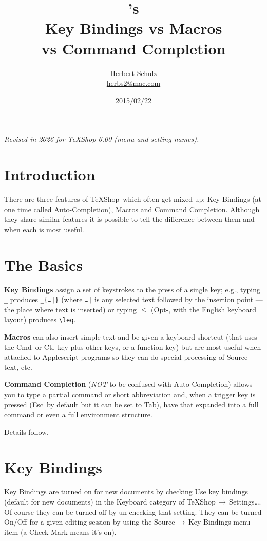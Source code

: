 \documentclass[11pt]{article}
\title{\TS's\\Key Bindings vs Macros\\vs Command Completion}
\author{Herbert Schulz\\\small\href{mailto:herbs2@mac.com}{herbs2@mac.com}}
\date{2015/02/22}
\newcommand{\ctlkey}{\textsf{Ctl}}
\newcommand{\cmdkey}{\textsf{Cmd}}
\newcommand{\esckey}{\textsf{Esc}}
\newcommand{\tabkey}{\textsf{Tab}}
\newcommand{\mnu}[1]{\textsf{#1}}
\newcommand{\cmd}[1]{\textsf{#1}}
\newcommand{\To}{\,\(\to\)\,}
\newcommand{\TS}{\textsf{\TeX Shop}}
\begin{document}
\maketitle
\noindent\textit{Revised in 2026 for TeXShop 6.00 (menu and setting names).}


\section{Introduction}

There are three features of \TS\ which often get mixed up: \cmd{Key Bindings} (at one time  called \cmd{Auto-Completion}), \cmd{Macros} and \cmd{Command Completion}. Although they share similar features it is possible to tell the difference between them and when each is most useful.

\section{The Basics}

\textbf{\cmd{Key Bindings}} assign a set of keystrokes to the press of a single key; e.g., typing \verb"_" produces \verb"_{…|}" (where \verb"…|" is any selected text followed by the insertion point --- the place where text is inserted) or typing \(\leq\) (\cmd{Opt-,} with the English keyboard layout) produces \verb"\leq".

\noindent\textbf{\cmd{Macros}} can also insert simple text and be given a keyboard shortcut (that uses the \cmdkey\ or \ctlkey\ key plus other keys, or a function key) but are most useful when attached to Applescript programs so they can do special processing of Source text, etc.

\noindent\textbf{\cmd{Command Completion}} (\emph{NOT} to be confused with \cmd{Auto-Completion}) allows you to type a partial command or short abbreviation and, when a trigger key is pressed (\esckey\ by default but it can be set to \tabkey), have that expanded into a full command or even a full environment structure.

Details follow.

\section{\cmd{Key Bindings}}

\cmd{Key Bindings} are turned on for new documents by checking \mnu{Use key bindings (default for new documents)} in the \mnu{Keyboard} category of \mnu{TeXShop}\To\mnu{Settings…}. Of course they can be turned off by un-checking that setting. They can be turned On/Off for a given editing session by using the \mnu{Source}\To\mnu{Key Bindings} menu item (a Check Mark means it's on).
\end{document}
